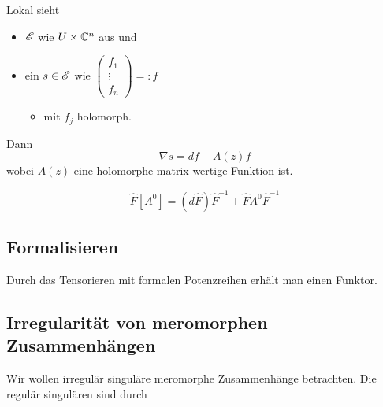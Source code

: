 \begin{rem}
  Lokal sieht
  \begin{itemize}
    \item $\mathscr{E}$ wie $U\times\mathbb{C}^n$ aus und
    \item ein $s\in\mathscr{E}$ wie 
      $\begin{pmatrix}f_{1}\\ \vdots\\ f_{n} \end{pmatrix}=:f$
      \begin{itemize}
        \item mit $f_j$ holomorph.
      \end{itemize}
  \end{itemize}
  Dann
  \[
    \nabla s=df - A(z)f
  \]
  wobei $A(z)$ eine holomorphe matrix-wertige Funktion ist.
  \begin{comment}
    Wollen diese Klassifizieren. Klassifiziere diese durch die Lösung von
    $\nabla s=0$. Dies ist eine DGL (ODE).
  \end{comment}
\end{rem}
\[
  \hat F[A^0]=(d\hat F)\hat F^{-1}+\hat FA^0\hat F^{-1}
\]
\subsection{Formalisieren} %
Durch das Tensorieren mit formalen Potenzreihen erhält man einen Funktor.
\TODO
\subsection{Irregularität von meromorphen Zusammenhängen} %
Wir wollen irregulär singuläre meromorphe Zusammenhänge betrachten. Die regulär
singulären sind durch \TODO

\TODO

\TODO[\cite{sabbah2007isomonodromic}: Def II.2.24]
